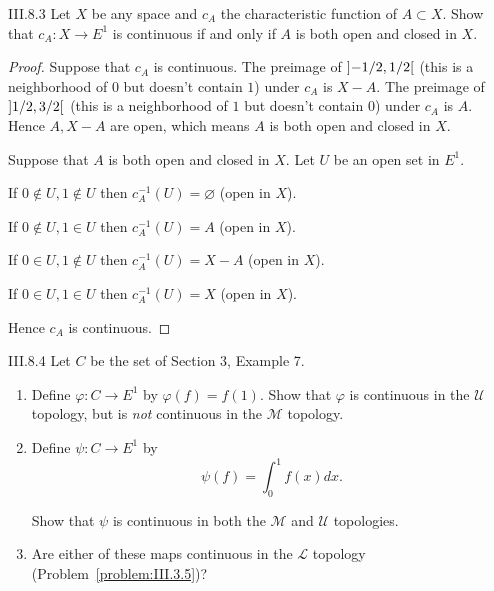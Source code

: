 \begin{problem}{III.8.3}
Let \(X\) be any space and \(c_{A}\) the characteristic function of \(A \subset X\). Show that \( c_{A}: X \to E^{1} \) is continuous if and only if \(A\) is both open and closed in \(X\).
\end{problem}

\begin{proof}
	Suppose that \( c_{A} \) is continuous. The preimage of \( \left]{-1/2, 1/2}\right[ \) (this is a neighborhood of \(0\) but doesn't contain \(1\)) under \( c_{A} \) is \( X - A \). The preimage of \( \left]{1/2, 3/2}\right[ \) (this is a neighborhood of \(1\) but doesn't contain \(0\)) under \( c_{A} \) is \( A \). Hence \( A, X - A \) are open, which means \(A\) is both open and closed in \(X\).

	Suppose that \( A \) is both open and closed in \(X\). Let \( U \) be an open set in \( E^{1} \).

	If \( 0 \notin U, 1 \notin U \) then \( c_{A}^{-1}(U) = \varnothing \) (open in \(X\)).

	If \( 0 \notin U, 1 \in U \) then \( c_{A}^{-1}(U) = A \) (open in \(X\)).

	If \( 0 \in U, 1 \notin U \) then \( c_{A}^{-1}(U) = X - A \) (open in \(X\)).

	If \( 0 \in U, 1 \in U \) then \( c_{A}^{-1}(U) = X \) (open in \(X\)).

	Hence \( c_{A} \) is continuous.
\end{proof}

\begin{problem}{III.8.4}
Let \(C\) be the set of Section 3, Example 7.
\begin{enumerate}[label={(\alph*)}]
	\item Define \( \varphi: C \to E^{1} \) by \( \varphi(f) = f(1) \). Show that \( \varphi \) is continuous in the \( \mathscr{U} \) topology, but is \textit{not} continuous in the \( \mathscr{M} \) topology.
	\item Define \( \psi: C \to E^{1} \) by
	      \[
		      \psi(f) = \int_{0}^{1} f(x) dx.
	      \]

	      Show that \(\psi\) is continuous in both the \(\mathscr{M}\) and \(\mathscr{U}\) topologies.
	\item Are either of these maps continuous in the \( \mathscr{L} \) topology (Problem~\ref{problem:III.3.5})?
\end{enumerate}
\end{problem}

